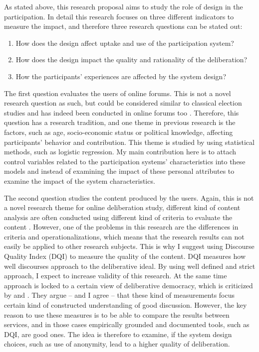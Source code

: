 \documentclass{article}
\begin{document}
As stated above, this research proposal aims to study the role of design in the participation. In detail this research focuses on three different indicators to measure the impact, and therefore three research questions can be stated out:

\begin{enumerate}
\item How does the design affect uptake and use of the participation system?
\item How does the design impact the quality and rationality of the deliberation?
\item How the participants' experiences are affected by the system design?
\end{enumerate}

The first question evaluates the users of online forums. This is not a novel research question as such, but could be considered similar to classical election studies and has indeed been conducted in online forums too . Therefore, this question has a research tradition, and one theme in previous research is the factors, such as age, socio-economic status or political knowledge, affecting participants' behavior and contribution. This theme is studied by using statistical methods, such as logistic regression. My main contribution here is to attach control variables related to the participation systems' characteristics into these models and instead of examining the impact of these personal attributes to examine the impact of the system characteristics.

The second question studies the content produced by the users. Again, this is not a novel research theme for online deliberation study, different kind of content analysis are often conducted using different kind of criteria to evaluate the content . However, one of the problems in this research are the differences in criteria and operationalizations, which means that the research results can not easily be applied to other research subjects. This is why I suggest using   Discourse Quality Index (DQI) to measure the quality of the content. DQI measures how well discourses approach to the deliberative ideal. By using well defined and strict approach, I expect to increase validity of this research. At the same time  approach is locked to a certain view of deliberative democracy, which is criticized by  and . They argue -- and I agree -- that these kind of measurements focus certain kind of constructed understanding of good discussion. However, the key reason to use these measures is to be able to compare the results between services, and in those cases empirically grounded and documented tools, such as DQI, are good ones. The idea is therefore to examine, if the system design choices, such as use of anonymity, lead to a higher quality of deliberation.
\end{document}
